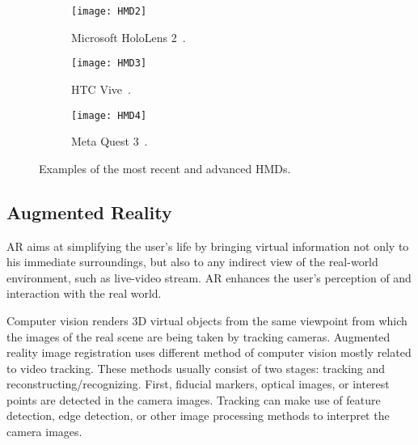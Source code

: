 \begin{figure}[h!]
    \centering
    \begin{subfigure}[b]{0.3\textwidth}
        \centering
        \texttt{[image: HMD2]}
        \caption{Microsoft HoloLens 2~\cite{headset_article}.}
        \label{fig:HM}
    \end{subfigure}
    \begin{subfigure}[b]{0.3\textwidth}
        \centering
        \texttt{[image: HMD3]}
        \caption{HTC Vive~\cite{SHERMAN2019258}.}
        \label{fig:y1}
    \end{subfigure}
    \hfill
    \begin{subfigure}[b]{0.3\textwidth}
        \centering
        \texttt{[image: HMD4]}
        \caption{Meta Quest 3~\cite{article}.}
        \label{fig:y2}
    \end{subfigure}
    \caption{Examples of the most recent and advanced \glspl{HMD}.}
    \label{fig:HMDs}
\end{figure}

\FloatBarrier

\subsection{Augmented Reality}
\label{sec:augmented_reality}

\gls{AR} aims at simplifying the user’s life by bringing virtual information not
only to his immediate surroundings, but also to any indirect view of the real-world
environment, such as live-video stream. \gls{AR} enhances the user’s perception of and
interaction with the real world. 

Computer vision renders \gls{3D} virtual objects from the same viewpoint from which the
images of the real scene are being taken by tracking cameras. Augmented reality image
registration uses different method of computer vision mostly related to video tracking.
These methods usually consist of two stages: tracking and reconstructing/recognizing. First,
fiducial markers, optical images, or interest points are detected in the camera images.
Tracking can make use of feature detection, edge detection, or other image processing
methods to interpret the camera images.

